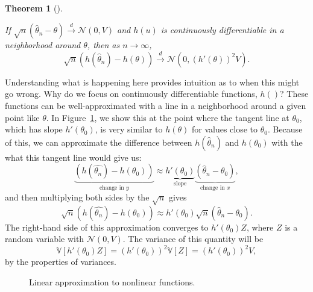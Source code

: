 \documentclass[
  13pt,
  letterpaper,
  DIV=11,
  numbers=noendperiod]{scrreprt}
\newcommand{\V}{\mathbb{V}}
\newcommand{\N}{\mathcal{N}}
\newcommand{\indist}{\overset{d}{\to}}
\theoremstyle{definition}
\theoremstyle{definition}
\theoremstyle{plain}
\newtheorem{theorem}{Theorem}[chapter]
\theoremstyle{remark}
\begin{document}
\begin{theorem}[]\protect\hypertarget{thm-delta-method}{}\label{thm-delta-method}

If \(\sqrt{n}\left(\widehat{\theta}_n - \theta\right) \indist \N(0, V)\)
and \(h(u)\) is continuously differentiable in a neighborhood around
\(\theta\), then as \(n\to\infty\), \[
\sqrt{n}\left(h(\widehat{\theta}_n) - h(\theta) \right) \indist \N(0, (h'(\theta))^2 V).
\]

\end{theorem}

Understanding what is happening here provides intuition as to when this
might go wrong. Why do we focus on continuously differentiable
functions, \(h()\)? These functions can be well-approximated with a line
in a neighborhood around a given point like \(\theta\). In
Figure~\ref{fig-delta}, we show this at the point where the tangent line
at \(\theta_0\), which has slope \(h'(\theta_0)\), is very similar to
\(h(\theta)\) for values close to \(\theta_0\). Because of this, we can
approximate the difference between \(h(\widehat{\theta}_n)\) and
\(h(\theta_0)\) with the what this tangent line would give us: \[
\underbrace{\left(h(\widehat{\theta_n}) - h(\theta_0)\right)}_{\text{change in } y} \approx \underbrace{h'(\theta_0)}_{\text{slope}} \underbrace{\left(\widehat{\theta}_n - \theta_0\right)}_{\text{change in } x},
\] and then multiplying both sides by the \(\sqrt{n}\) gives \[
\sqrt{n}\left(h(\widehat{\theta_n}) - h(\theta_0)\right) \approx h'(\theta_0)\sqrt{n}\left(\widehat{\theta}_n - \theta_0\right). 
\] The right-hand side of this approximation converges to
\(h'(\theta_0)Z\), where \(Z\) is a random variable with \(\N(0, V)\).
The variance of this quantity will be \[
\V[h'(\theta_0)Z] = (h'(\theta_0))^2\V[Z] = (h'(\theta_0))^2V,
\] by the properties of variances.

\begin{figure}[th]


\caption{\label{fig-delta}Linear approximation to nonlinear functions.}

\end{figure}%
\end{document}
